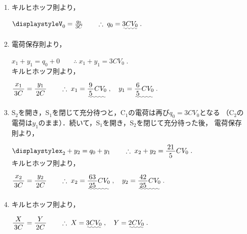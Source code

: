﻿\documentclass[../../../ps_a.tex]{subfiles}
\begin{document}
    \begin{enumerate}
        \item キルヒホッフ則より，
            
            \myspaceb%
            $\displaystyle%
                V_0 = \frac{q_0}{3C} \qquad \therefore \; q_0 = \uwave{3CV_0} \;.
            $
        \item 電荷保存則より，
            
            \myspaceb%
            $\displaystyle%
                x_1 + y_1 = q_0 + 0 \qquad \therefore \; x_1 + y_1 = 3CV_0 \;.
            $\\            
            キルヒホッフ則より，
            
            \myspaceb%
            $\displaystyle%
                \myfracc{x_1}{3C} = \myfracc{y_1}{2C}%
                \qquad \therefore \; x_1 = \uwave{\myfraca{9}{5} CV_0} \;,%
                \quad y_1 = \uwave{\myfraca{6}{5} CV_0} \;.
            $
        \item S$_2$を開き，S$_1$を閉じて充分待つと，C$_1$の電荷は再び$q_0=3CV_0$となる%
            （C$_2$の電荷は$y_1$のまま）．続いて，S$_1$を開き，S$_2$を閉じて充分待った後，%
            電荷保存則より，
            
            \myspaceb%
            $\displaystyle%
                x_2 + y_2 = q_0 + y_1 \qquad \therefore \; x_2 + y_2 = \myfraca{21}{5}CV_0 \;.
            $\\
            キルヒホッフ則より，
            
            \myspaceb%
            $\displaystyle%
                \myfracc{x_2}{3C} = \myfracc{y_2}{2C}%
                \qquad \therefore \; x_2 = \uwave{\myfraca{63}{25} CV_0} \;,%
                \quad y_2 = \uwave{\myfraca{42}{25} CV_0} \;.
            $
        \item キルヒホッフ則より，
            
            \myspaceb%
            $\displaystyle%
                \myfraca{X}{3C} = \myfraca{Y}{2C}%
                \qquad \therefore \; X = \uwave{3CV_0} \;,%
                \quad Y = \uwave{2CV_0} \;.
            $
    \end{enumerate}
\end{document}
